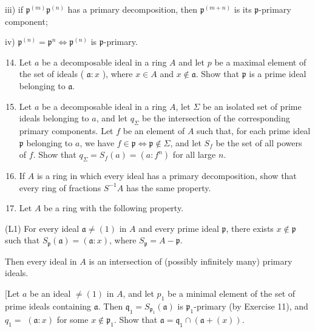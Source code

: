 \documentclass{standalone}
\theoremstyle{definition}
\theoremstyle{remark}
\begin{document}
iii) if $\mathfrak{p}^{(m)} \mathfrak{p}^{(n)}$ has a primary decomposition,
then $\mathfrak{p}^{(m+n)}$ is its $\mathfrak{p}$-primary component;

iv) $\mathfrak{p}^{(n)}=\mathfrak{p}^{n} \Leftrightarrow \mathfrak{p}^{(n)}$ is
$\mathfrak{p}$-primary.

\begin{enumerate}
  \setcounter{enumi}{13}
  \item Let $a$ be a decomposable ideal in a ring $A$ and let $p$ be a maximal
  element of the set of ideals ( $\mathfrak{a}: x$ ), where $x \in A$ and $x
  \notin \mathfrak{a}$. Show that $\mathfrak{p}$ is a prime ideal belonging to
  $\mathfrak{a}$.

  \item Let $a$ be a decomposable ideal in a ring $A$, let $\Sigma$ be an
  isolated set of prime ideals belonging to $a$, and let $q_{\Sigma}$ be the
  intersection of the corresponding primary components. Let $f$ be an element of
  $A$ such that, for each prime ideal $\mathfrak{p}$ belonging to $a$, we have
  $f \in \mathfrak{p} \Leftrightarrow \mathfrak{p} \notin \Sigma$, and let
  $S_{f}$ be the set of all powers of $f$. Show that
  $q_{\Sigma}=S_{f}(a)=\left(a: f^{n}\right)$ for all large $n$.

  \item If $A$ is a ring in which every ideal has a primary decomposition, show
  that every ring of fractions $S^{-1} A$ has the same property.

  \item Let $A$ be a ring with the following property.

\end{enumerate}

(L1) For every ideal $\mathfrak{a} \neq(1)$ in $A$ and every prime ideal
$\mathfrak{p}$, there exists $x \notin \mathfrak{p}$ such that
$S_{\mathfrak{p}}(\mathfrak{a})=(\mathfrak{a}: x)$, where
$S_{\mathfrak{p}}=A-\mathfrak{p}$.

Then every ideal in $A$ is an intersection of (possibly infinitely many) primary
ideals.

[Let $a$ be an ideal $\neq(1)$ in $A$, and let $p_{1}$ be a minimal element of
the set of prime ideals containing $\mathfrak{a}$. Then
$\mathfrak{q}_{1}=S_{\mathfrak{p}_{1}}(\mathfrak{a})$ is
$\mathfrak{p}_{1}$-primary (by Exercise 11), and $q_{1}=$ $(\mathfrak{a}: x)$
for some $x \notin \mathfrak{p}_{1}$. Show that $\mathfrak{a}=\mathfrak{q}_{1}
\cap(\mathfrak{a}+(x))$.
\end{document}
